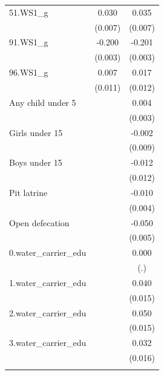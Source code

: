 \begin{table}[htbp]
\begin{tabular}{l cc}
\addlinespace
51.WS1\_g    &       0.030\sym{***}&       0.035\sym{***}\\
            &     (0.007)         &     (0.007)         \\
\addlinespace
91.WS1\_g    &      -0.200\sym{***}&      -0.201\sym{***}\\
            &     (0.003)         &     (0.003)         \\
\addlinespace
96.WS1\_g    &       0.007         &       0.017         \\
            &     (0.011)         &     (0.012)         \\
\addlinespace
Any child under 5&                     &       0.004         \\
            &                     &     (0.003)         \\
\addlinespace
Girls under 15&                     &      -0.002         \\
            &                     &     (0.009)         \\
\addlinespace
Boys under 15&                     &      -0.012         \\
            &                     &     (0.012)         \\
\addlinespace
Pit latrine &                     &      -0.010\sym{**} \\
            &                     &     (0.004)         \\
\addlinespace
Open defecation&                     &      -0.050\sym{***}\\
            &                     &     (0.005)         \\
\addlinespace
0.water\_carrier\_edu&                     &       0.000         \\
            &                     &         (.)         \\
\addlinespace
1.water\_carrier\_edu&                     &       0.040\sym{***}\\
            &                     &     (0.015)         \\
\addlinespace
2.water\_carrier\_edu&                     &       0.050\sym{***}\\
            &                     &     (0.015)         \\
\addlinespace
3.water\_carrier\_edu&                     &       0.032\sym{**} \\
            &                     &     (0.016)         \\
\addlinespace

\end{tabular}
\end{table}
